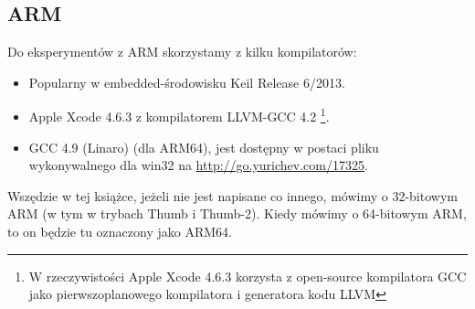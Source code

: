 \subsection{ARM}
\label{sec:hw_ARM}

\myindex{\idevices}
Do eksperymentów z ARM skorzystamy z kilku kompilatorów:

\begin{itemize}
\item Popularny w embedded-środowisku Keil Release 6/2013.

\item Apple Xcode 4.6.3 z kompilatorem LLVM-GCC 4.2
\footnote{W rzeczywistości Apple Xcode 4.6.3 korzysta z open-source kompilatora GCC jako pierwszoplanowego kompilatora i generatora kodu LLVM}.

\item GCC 4.9 (Linaro) (dla ARM64), 
jest dostępny w postaci pliku wykonywalnego dla win32 na \url{http://go.yurichev.com/17325}.

\end{itemize}

Wszędzie w tej książce, jeżeli nie jest napisane co innego, mówimy o 32-bitowym ARM (w tym w trybach Thumb i Thumb-2).
Kiedy mówimy o 64-bitowym ARM, to on będzie tu oznaczony jako ARM64.








